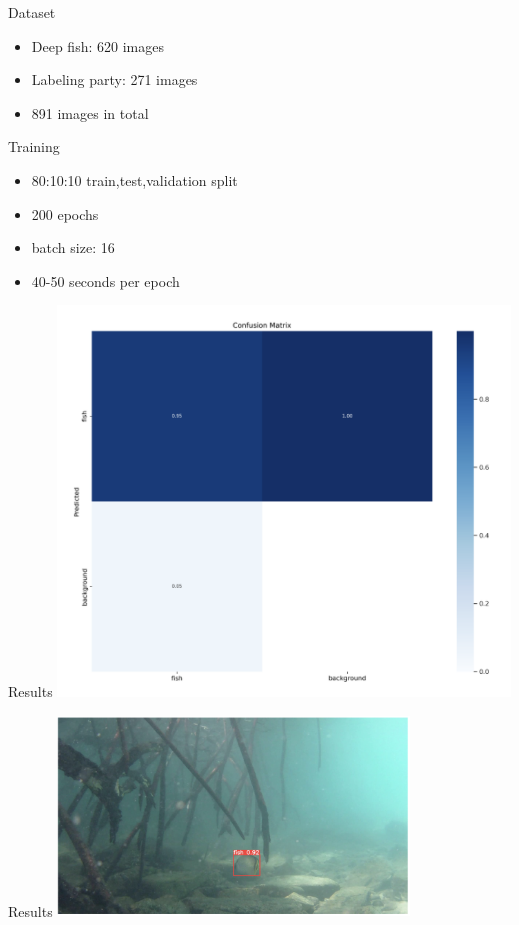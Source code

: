  \begin{frame}{Dataset}
    \begin{itemize}
        \item Deep fish: 620 images
         \item Labeling party: 271 images
         \item 891 images in total
    \end{itemize}    
    

 \end{frame}

 \begin{frame}{Training}
    \begin{itemize}
        \item 80:10:10 train,test,validation split
         \item 200 epochs 
         \item batch size: 16 
         \item 40-50 seconds per epoch 
    \end{itemize}    
    

 \end{frame}


 \begin{frame}{Results}
    \centering
        \includegraphics[height=0.9\textheight,width=0.9\textwidth,keepaspectratio]{images/1.png}
    

 \end{frame}

 \begin{frame}{Results}
    \centering
        \includegraphics[height=0.7\textheight,width=0.7\textwidth,keepaspectratio]{images/2.png}
    

 \end{frame}

